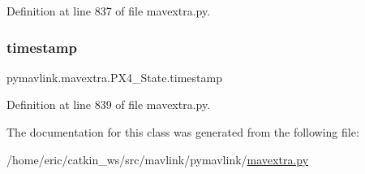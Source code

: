 Definition at line 837 of file mavextra.\+py.

\mbox{\label{classpymavlink_1_1mavextra_1_1PX4__State_a6197e3a9dd12b294c85a5362cec42484}} 
\subsubsection{\texorpdfstring{timestamp}{timestamp}}
{\footnotesize\ttfamily pymavlink.\+mavextra.\+P\+X4\+\_\+\+State.\+timestamp}



Definition at line 839 of file mavextra.\+py.



The documentation for this class was generated from the following file\+:\begin{DoxyCompactItemize}
\item 
/home/eric/catkin\+\_\+ws/src/mavlink/pymavlink/\mbox{\hyperlink{mavextra_8py}{mavextra.\+py}}\end{DoxyCompactItemize}
